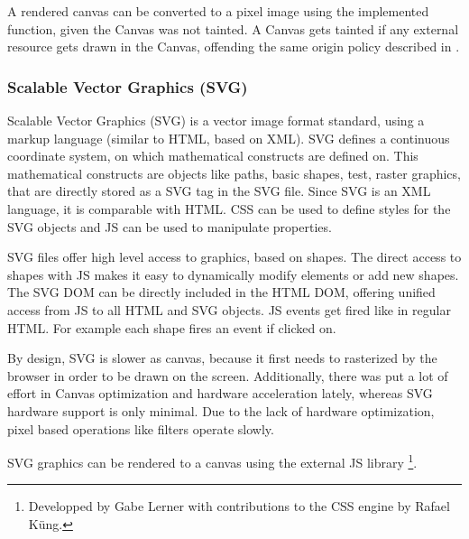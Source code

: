 A rendered canvas can be converted to a pixel image using the implemented  function, given the Canvas was not tainted.
A Canvas gets tainted if any external resource gets drawn in the Canvas, offending the same origin policy described in .

\subsubsection{Scalable Vector Graphics (SVG)}
\label{sec:svg}

Scalable Vector Graphics (SVG) is a vector image format standard, using a markup language (similar to HTML, based on XML).
SVG defines a continuous coordinate system, on which mathematical constructs are defined on.
This mathematical constructs are objects like paths, basic shapes, test, raster graphics, that are directly stored as a SVG tag in the SVG file.
Since SVG is an XML language, it is comparable with HTML.
CSS can be used to define styles for the SVG objects and JS can be used to manipulate properties.

SVG files offer high level access to graphics, based on shapes.
The direct access to shapes with JS makes it easy to dynamically modify elements or add new shapes.
The SVG DOM can be directly included in the HTML DOM, offering unified access from JS to all HTML and SVG objects.
JS events get fired like in regular HTML.
For example each shape fires an  event if clicked on.


By design, SVG is slower as canvas, because it first needs to rasterized by the browser in order to be drawn on the screen.
Additionally, there was put a lot of effort in Canvas optimization and hardware acceleration lately, whereas SVG hardware support is only minimal.
Due to the lack of hardware optimization, pixel based operations like filters operate slowly.

SVG graphics can be rendered to a canvas using the external JS library \footnote{Developped by Gabe Lerner with contributions to the CSS engine by Rafael Küng.}.




